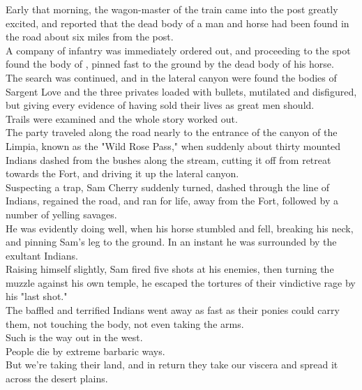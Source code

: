 

Early that morning, the wagon-master of the train came into the post greatly excited, and reported that the dead body of a man and horse had been found in the road about six miles from the post.\\

A company of infantry was immediately ordered out, and proceeding to the spot found the body of , pinned fast to the ground by the dead body of his horse.\\

The search was continued, and in the lateral canyon were found the bodies of Sargent Love and the three privates loaded with bullets, mutilated and disfigured, but giving every evidence of having sold their lives as great men should.\\

Trails were examined and the whole story worked out.\\

The party traveled along the road nearly to the entrance of the canyon of the Limpia, known as the "Wild Rose Pass," when suddenly about thirty mounted Indians dashed from the bushes along the stream, cutting it off from retreat towards the Fort, and driving it up the lateral canyon.\\

Suspecting a trap, Sam Cherry suddenly turned, dashed through the line of Indians, regained the road, and ran for life, away from the Fort, followed by a number of yelling savages.\\
He was evidently doing well, when his horse stumbled and fell, breaking his neck, and pinning Sam's leg to the ground. In an instant he was surrounded by the exultant Indians.\\

Raising himself slightly, Sam fired five shots at his enemies, then turning the muzzle against his own temple, he escaped the tortures of their vindictive rage by his "last shot."\\
The baffled and terrified Indians went away as fast as their ponies could carry them, not touching the body, not even taking the arms.\\

Such is the way out in the west.\\
People die by extreme barbaric ways.\\
But we're taking their land, and in return they take our viscera and spread it across the desert plains.\\

